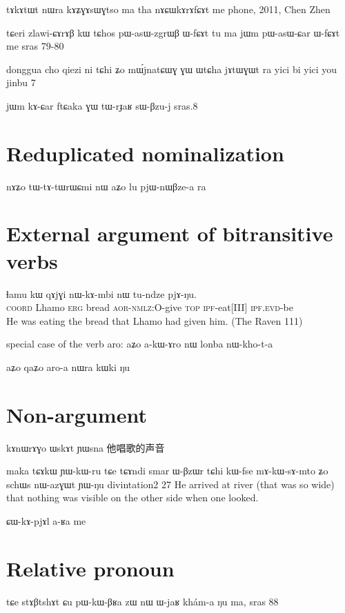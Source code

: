 \documentclass[oldfontcommands,oneside,a4paper,11pt]{memoir}
\newcommand{\ipa}[1]{{\phon #1}} %
\newcommand{\wav}[1]{}%
\newcommand{\aor}{\textsc{aor}}
\newcommand{\coord}{\textsc{coord}}
\newcommand{\erg}{\textsc{erg}}
\newcommand{\evd}{\textsc{evd}}
\newcommand{\ipf}{\textsc{ipf}}
\newcommand{\nmlz}{\textsc{nmlz}}
\newcommand{\topic}{\textsc{top}}
\begin{document}
tɤkɤtɯt nɯra kɤʑɣɤsɯɣtso ma tha nɤɕɯkɤrɤfɕɤt me
phone, 2011, Chen Zhen

tɕeri zlawi-ɕɤrɤβ kɯ tɕhos pɯ-asɯ-zgrɯβ ɯ-fɕɤt tu ma
 jɯm pɯ-asɯ-ɕar ɯ-fɕɤt me
sras 79-80

donggua cho qiezi ni tɕhi ʑo mɯ́jnatɕɯɣ ɣɯ ɯtɕha jɤtɯɣɯt ra
yici bi yici you jinbu 7

jɯm kɤ-ɕar ftɕaka ɣɯ tɯ-rɟaʁ sɯ-βzu-j 
sras.8

\section{Reduplicated nominalization}
nɤʑo tɯ-tɤ-tɯrɯɕmi nɯ aʑo lu pjɯ-nɯβze-a ra
\wav{ex-tWtAtWrWCmi}

\section{External argument of bitransitive verbs}  \label{sec:relativisation.external}

\begin{exe}
\ex
\gll      \ipa{tɕe} 	\ipa{ɬamu} 	\ipa{kɯ} 	\ipa{qɤjɣi} 	\ipa{nɯ-kɤ-mbi} 	\ipa{nɯ} 	\ipa{tu-ndze} 	\ipa{pjɤ-ŋu.}   \\
\coord{} Lhamo \erg{} bread \aor{}-\nmlz{}:O-give \topic{} \ipf{}-eat[III] \ipf.\evd{}-be  \\
 \glt    He was eating the bread that Lhamo had given him. (The Raven 111)
\end{exe} 



special case of the verb aro:
aʑo a-kɯ-ɤro nɯ lonba nɯ-kho-t-a

aʑo qaʑo aro-a nɯra kɯki ŋu
\wav{aro-relative} \wav{aro-relative2}
\section{Non-argument}
kɤnɯrɤɣo ɯskɤt ɲɯsna
他唱歌的声音

maka tɕɤkɯ ɲɯ-kɯ-ru tɕe tɕɤndi smar ɯ-βzɯr tɕhi kɯ-fse mɤ-kɯ-sɤ-mto ʑo schɯs nɯ-azɣɯt ɲɯ-ŋu
divintation2 27
He arrived at river (that was so wide) that nothing was visible on the other side when one looked.

ɕɯ-kɤ-pjɤl a-ʁa me

\section{Relative pronoun}

tɕe stɤβtshɤt ɕu pɯ-kɯ-βʁa zɯ nɯ ɯ-jaʁ khám-a ŋu ma,
sras 88
\end{document}
